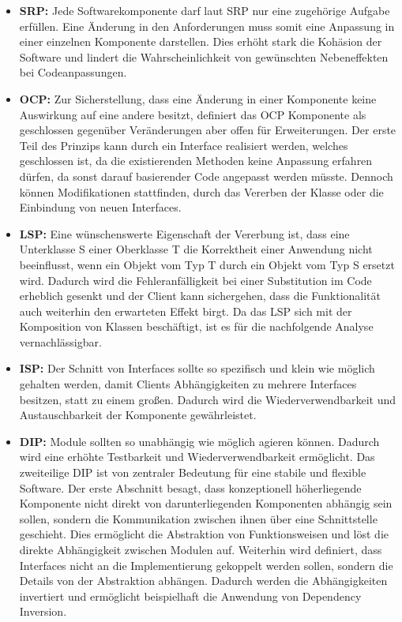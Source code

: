 \begin{itemize}[]
	\item \textbf{\acrlong{SRP}: } {Jede Softwarekomponente darf laut SRP nur eine zugehörige Aufgabe erfüllen. Eine Änderung in den Anforderungen muss somit eine Anpassung in einer einzelnen Komponente darstellen. Dies erhöht stark die Kohäsion der Software und lindert die Wahrscheinlichkeit von gewünschten Nebeneffekten bei Codeanpassungen.}
	\item \textbf{\acrlong{OCP}: } {Zur Sicherstellung, dass eine Änderung in einer Komponente keine Auswirkung auf eine andere besitzt, definiert das OCP Komponente als geschlossen gegenüber Veränderungen aber offen für Erweiterungen. Der erste Teil des Prinzips kann durch ein Interface realisiert werden, welches geschlossen ist, da die existierenden Methoden keine Anpassung erfahren dürfen, da sonst darauf basierender Code angepasst werden müsste. Dennoch können Modifikationen stattfinden, durch das Vererben der Klasse oder die Einbindung von neuen Interfaces.}
	\item \textbf{\acrlong{LSP}: } {Eine wünschenswerte Eigenschaft der Vererbung ist, dass eine Unterklasse S einer Oberklasse T die Korrektheit einer Anwendung nicht beeinflusst, wenn ein Objekt vom Typ T durch ein Objekt vom Typ S ersetzt wird. Dadurch wird die Fehleranfälligkeit bei einer Substitution im Code erheblich gesenkt und der Client kann sichergehen, dass die Funktionalität auch weiterhin den erwarteten Effekt birgt. Da das LSP sich mit der Komposition von Klassen beschäftigt, ist es für die nachfolgende Analyse vernachlässigbar.}
	\item \textbf{\acrlong{ISP}: } {Der Schnitt von Interfaces sollte so spezifisch und klein wie möglich gehalten werden, damit Clients Abhängigkeiten zu mehrere Interfaces besitzen, statt zu einem großen. Dadurch wird die Wiederverwendbarkeit und Austauschbarkeit der Komponente gewährleistet.}
	\item \textbf{\acrlong{DIP}: } {Module sollten so unabhängig wie möglich agieren können. Dadurch wird eine erhöhte Testbarkeit und Wiederverwendbarkeit ermöglicht. Das zweiteilige DIP ist von zentraler Bedeutung für eine stabile und flexible Software. Der erste Abschnitt besagt, dass konzeptionell höherliegende Komponente nicht direkt von darunterliegenden Komponenten abhängig sein sollen, sondern die Kommunikation zwischen ihnen über eine Schnittstelle geschieht. Dies ermöglicht die Abstraktion von Funktionsweisen und löst die direkte Abhängigkeit zwischen Modulen auf. Weiterhin wird definiert, dass Interfaces nicht an die Implementierung gekoppelt werden sollen, sondern die Details von der Abstraktion abhängen. Dadurch werden die Abhängigkeiten invertiert und ermöglicht beispielhaft die Anwendung von Dependency Inversion.}
\end{itemize}

